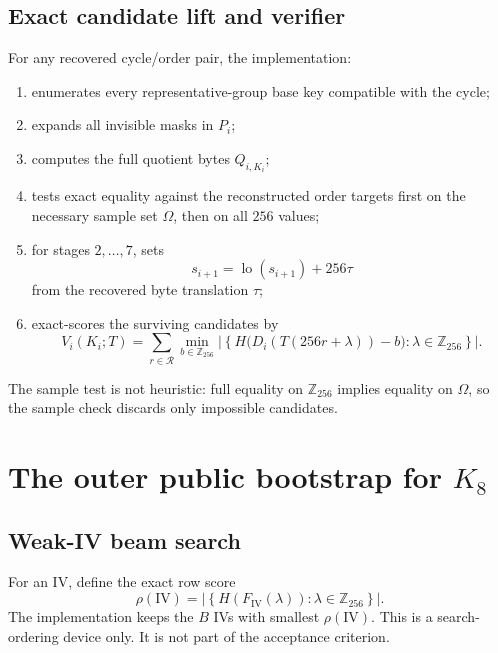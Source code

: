\documentclass[11pt]{article}
\newcommand{\Z}[1]{\mathbb{Z}_{#1}}
\newcommand{\lo}{\operatorname{lo}}
\begin{document}
\subsection{Exact candidate lift and verifier}
For any recovered cycle/order pair, the implementation:
\begin{enumerate}[label=\arabic*.,leftmargin=1.5em]
\item enumerates every representative-group base key compatible with the cycle;
\item expands all invisible masks in $P_i$;
\item computes the full quotient bytes $Q_{i,K_i}$;
\item tests exact equality against the reconstructed order targets first on the necessary sample set $\Omega$, then on all $256$ values;
\item for stages $2,\dots,7$, sets
\[
s_{i+1}=\lo(s_{i+1}) + 256\tau
\]
from the recovered byte translation $\tau$;
\item exact-scores the surviving candidates by
\[
V_i(K_i;T)=\sum_{r\in\mathcal R}
\min_{b\in\Z{256}}
\left|
\left\{
H\bigl(D_i(T(256r+\lambda))-b\bigr):\lambda\in\Z{256}
\right\}
\right|.
\]
\end{enumerate}
The sample test is not heuristic: full equality on $\Z{256}$ implies equality on $\Omega$, so the sample check discards only impossible candidates.

\section{The outer public bootstrap for \texorpdfstring{$K_8$}{K8}}
\subsection{Weak-IV beam search}
For an IV, define the exact row score
\[
\rho(\mathrm{IV})
=
\left|
\left\{
H(F_{\mathrm{IV}}(\lambda)) : \lambda\in\Z{256}
\right\}
\right|.
\]
The implementation keeps the $B$ IVs with smallest $\rho(\mathrm{IV})$. This is a search-ordering device only. It is not part of the acceptance criterion.
\end{document}
